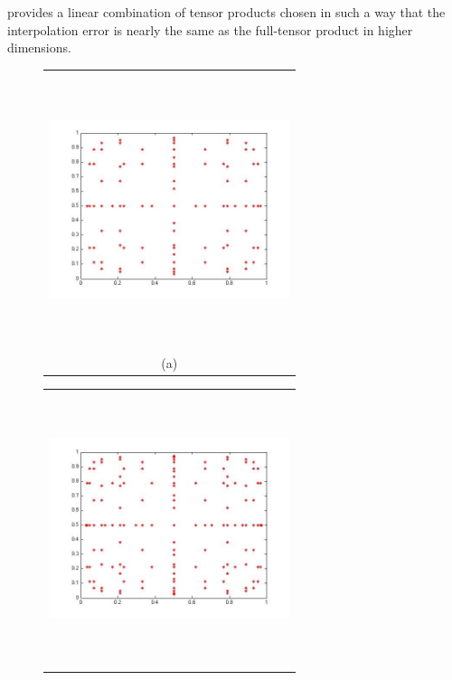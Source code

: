 \documentclass{article}
\newcommand{\Pic}[2][0.85]{\begin{center}\texttt{[image: \#2]}
 \end{center} }
\begin{document}
 provides a linear combination of tensor products chosen in such a way that the interpolation error is 
 nearly the same as the full-tensor product in higher dimensions. 
\begin{figure}[H]
      \begin{minipage}[b]{0.6\textwidth}
        \begin{tabular}{c}
       \includegraphics[width=7cm,height=8cm,keepaspectratio]{fig/GQU_2_6.jpg}\\
        (a)
        \end{tabular}
    \end{minipage}
    \begin{minipage}{0.6\textwidth}
        \begin{tabular}{c}
	\includegraphics[width=7cm,height=8cm,keepaspectratio]{fig/GQU_2_7.jpg}\\

\end{tabular}
\end{minipage}
\end{figure}
\end{document}
